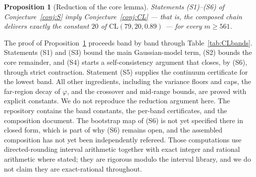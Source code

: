 \documentclass[11pt]{amsart}
\theoremstyle{plain}
\newtheorem{proposition}[theorem]{Proposition}
\theoremstyle{definition}
\theoremstyle{remark}
\begin{document}
\begin{proposition}[Reduction of the core lemma]
\label{prop:CLred}
Statements (S1)--(S6) of Conjecture~\ref{conj:S} imply
Conjecture~\ref{conj:CL} --- that is, the composed chain delivers exactly
the constant $20$ of $\mathrm{CL}(79,20,0.89)$ --- for every $m\ge561$.
\end{proposition}

The proof of Proposition~\ref{prop:CLred} proceeds band by band through
Table~\ref{tab:CLbands}. Statements (S1) and (S3) bound the main
Gaussian-model term, (S2) bounds the core remainder, and (S4) starts a
self-consistency argument that closes, by (S6), through strict contraction.
Statement (S5) supplies the continuum certificate for the lowest band. All other
ingredients, including the variance floors and caps, the far-region decay
of $\varphi$, and the crossover and mid-range bounds, are proved with
explicit constants. We do not reproduce the reduction argument here. The
repository contains the band constants, the per-band certificates, and the
composition document. The bootstrap map of (S6) is not yet specified there in closed form, which is part of why (S6) remains open, and the assembled composition has not yet been independently refereed. Those
computations use
directed-rounding interval arithmetic together with exact integer and
rational arithmetic where stated; they are rigorous modulo the interval
library, and we do not claim they are exact-rational throughout.
\end{document}
